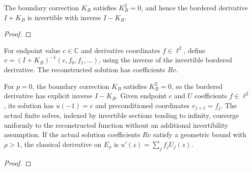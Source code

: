 
\begin{supporting}
\begin{theorem}
\label{thm:first-order-derivative-invertibility}
\leanok
The boundary correction $K_B$ satisfies $K_B^2=0$, and hence the bordered
derivative $I+K_B$ is invertible with inverse $I-K_B$.
\end{theorem}
\begin{proof}
\leanok
\end{proof}

\begin{definition}
\label{def:first-order-derivative-solution}
\leanok
For endpoint value $c\in\mathbb C$ and derivative coordinates $f\in\ell^2$,
define $v=(I+K_B)^{-1}(c,f_0,f_1,\ldots)$, using the inverse of the
invertible bordered derivative. The reconstructed solution has coefficients $Rv$.
\end{definition}
\end{supporting}


\begin{theorem}
\label{thm:first-order-derivative-solve}
\leanok
For $p=0$, the boundary correction $K_B$ satisfies $K_B^2=0$, so the bordered derivative has explicit inverse $I-K_B$. Given endpoint $c$ and $U$ coefficients $f\in\ell^2$, its solution has $u(-1)=c$ and preconditioned coordinates $v_{j+1}=f_j$. The actual finite solves, indexed by invertible sections tending to
infinity, converge uniformly to the reconstructed function without an
additional invertibility assumption. If the actual solution coefficients $Rv$ satisfy a geometric bound with $\rho>1$, the classical derivative on $E_\rho$ is $u\prime(z)=\sum_j f_jU_j(z)$.
\end{theorem}
\begin{proof}
\leanok
\end{proof}

